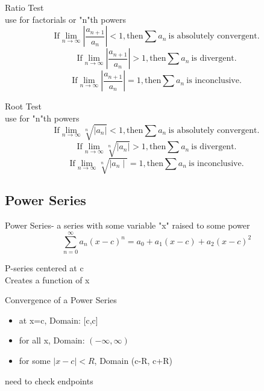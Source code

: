 \documentclass[12pt]{article}
\numberwithin{equation}{subsection}
\begin{document}
Ratio Test\\
\hangindent=2cm use for factorials or "n"th powers
\begin{equation}
\textrm{If} \lim_{n\rightarrow \infty} \left\vert \frac{a_{n+1}}{a_{n}} \right\vert<1 , \textrm{then}\sum a_{n}\ \textrm{is absolutely convergent.}
\end{equation}
\begin{equation}
\textrm{If} \lim_{n\rightarrow \infty} \left\vert \frac{a_{n+1}}{a_{n}} \right\vert>1 , \textrm{then}\sum a_{n}\ \textrm{is divergent.}
\end{equation}
\begin{equation}
\textrm{If} \lim_{n\rightarrow \infty} \left\vert \frac{a_{n+1}}{a_{n}} \right\vert=1 , \textrm{then}\sum a_{n}\ \textrm{is inconclusive.}
\end{equation}

Root Test\\
\hangindent=2cm use for "n"th powers
\begin{equation}
\textrm{If} \lim_{n\rightarrow \infty} \sqrt[n]{\vert a_{n} \vert} <1 , \textrm{then}\sum a_{n}\ \textrm{is absolutely convergent.}
\end{equation}
\begin{equation}
\textrm{If} \lim_{n\rightarrow \infty} \sqrt[n]{\vert a_{n}\vert } >1 , \textrm{then}\sum a_{n}\ \textrm{is divergent.}
\end{equation}
\begin{equation}
\textrm{If} \lim_{n\rightarrow \infty} \sqrt[n]{\mid a_{n} \mid } =1 , \textrm{then}\sum a_{n}\ \textrm{is inconclusive.}
\end{equation}
\newpage

\subsection{Power Series}
Power Series- a series with some variable "x" raised to some power
\begin{equation}
\sum_{n=0}^{\infty}a_{n}(x-c)^{n}= a_{0}+a_{1}(x-c)+a_{2}(x-c)^{2}
\end{equation}
\begin{center}
P-series centered at c\\
Creates a function of x
\end{center}
\bigskip

Convergence of a Power Series
\begin{itemize}
\item at x=c, Domain: [c,c]
\item for all x, Domain: $(-\infty,\infty)$
\item for some $\mid x-c \mid < R$, Domain (c-R, c+R)
\end{itemize}
\begin{center}
need to check endpoints
\end{center}
\end{document}
